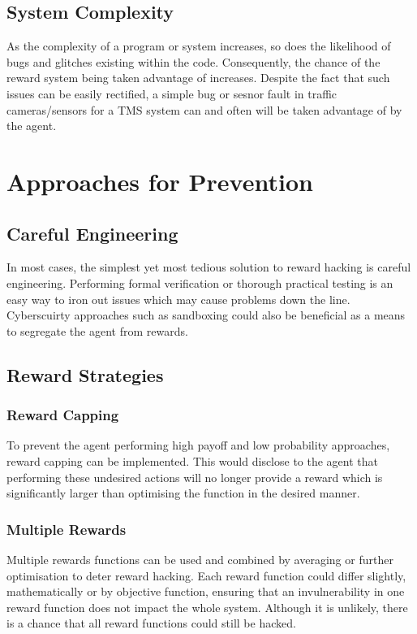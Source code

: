 \documentclass[a4paper,12pt]{report}
\begin{document}
\subsection{System Complexity}
As the complexity of a program or system increases, so does the likelihood of bugs and glitches existing within the code.
Consequently, the chance of the reward system being taken advantage of increases. 
Despite the fact that such issues can be easily rectified, a simple bug or sesnor fault in traffic cameras/sensors  for a TMS system can and often will be taken advantage of by the agent. 


\section{Approaches for Prevention}
\subsection{Careful Engineering}
In most cases, the simplest yet most tedious solution to reward hacking is careful engineering.
Performing formal verification or thorough practical testing is an easy way to iron out issues which may cause problems down the line.
Cyberscuirty approaches such as sandboxing could also be beneficial as a means to segregate the agent from rewards.

\subsection{Reward Strategies}

\subsubsection{Reward Capping}
To prevent the agent performing high payoff and low probability approaches, reward capping can be implemented.
This would disclose to the agent that performing these undesired actions will no longer provide a reward which is significantly larger than optimising the function in the desired manner.

\subsubsection{Multiple Rewards}
Multiple rewards functions can be used and combined by averaging or further optimisation to deter reward hacking.
Each reward function could differ slightly, mathematically or by objective function, ensuring that an invulnerability in one reward function does not impact the whole system.
Although it is unlikely, there is a chance that all reward functions could still be hacked.
\end{document}
